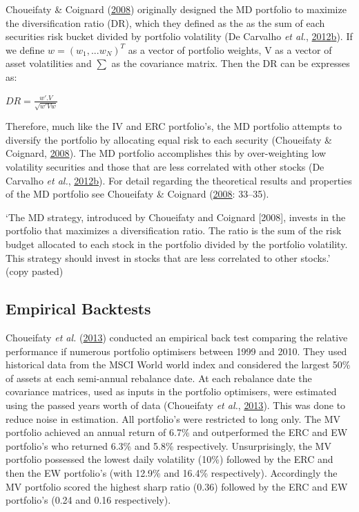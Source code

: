 \documentclass[11pt,preprint, authoryear]{elsarticle}
\numberwithin{equation}{section}
\numberwithin{figure}{section}
\numberwithin{table}{section}
\begin{document}
Choueifaty \& Coignard (\protect\hyperlink{ref-choueifaty2008}{2008})
originally designed the MD portfolio to maximize the diversification
ratio (DR), which they defined as the as the sum of each securities risk
bucket divided by portfolio volatility (De Carvalho \emph{et al.},
\protect\hyperlink{ref-leote}{2012}\protect\hyperlink{ref-leote}{b}). If
we define \(w=(w_1,...w_N)^T\) as a vector of portfolio weights, V as a
vector of asset volatilities and \(\sum\) as the covariance matrix. Then
the DR can be expresses as:

\(DR= \frac{w'.V}{\sqrt{w'Vw}}\)

Therefore, much like the IV and ERC portfolio's, the MD portfolio
attempts to diversify the portfolio by allocating equal risk to each
security (Choueifaty \& Coignard,
\protect\hyperlink{ref-choueifaty2008}{2008}). The MD portfolio
accomplishes this by over-weighting low volatility securities and those
that are less correlated with other stocks (De Carvalho \emph{et al.},
\protect\hyperlink{ref-leote}{2012}\protect\hyperlink{ref-leote}{b}).
For detail regarding the theoretical results and properties of the MD
portfolio see Choueifaty \& Coignard
(\protect\hyperlink{ref-choueifaty2008}{2008}: 33--35).

`The MD strategy, introduced by Choueifaty and Coignard {[}2008{]},
invests in the portfolio that maximizes a diversification ratio. The
ratio is the sum of the risk budget allocated to each stock in the
portfolio divided by the portfolio volatility. This strategy should
invest in stocks that are less correlated to other stocks.' (copy
pasted)

\hypertarget{empirical-backtests}{%
\subsection{Empirical Backtests}\label{empirical-backtests}}

Choueifaty \emph{et al.} (\protect\hyperlink{ref-choueifaty2013}{2013})
conducted an empirical back test comparing the relative performance if
numerous portfolio optimisers between 1999 and 2010. They used
historical data from the MSCI World world index and considered the
largest 50\% of assets at each semi-annual rebalance date. At each
rebalance date the covariance matrices, used as inputs in the portfolio
optimisers, were estimated using the passed years worth of data
(Choueifaty \emph{et al.},
\protect\hyperlink{ref-choueifaty2013}{2013}). This was done to reduce
noise in estimation. All portfolio's were restricted to long only. The
MV portfolio achieved an annual return of 6.7\% and outperformed the ERC
and EW portfolio's who returned 6.3\% and 5.8\% respectively.
Unsurprisingly, the MV portfolio possessed the lowest daily volatility
(10\%) followed by the ERC and then the EW portfolio's (with 12.9\% and
16.4\% respectively). Accordingly the MV portfolio scored the highest
sharp ratio (0.36) followed by the ERC and EW portfolio's (0.24 and 0.16
respectively).
\end{document}
